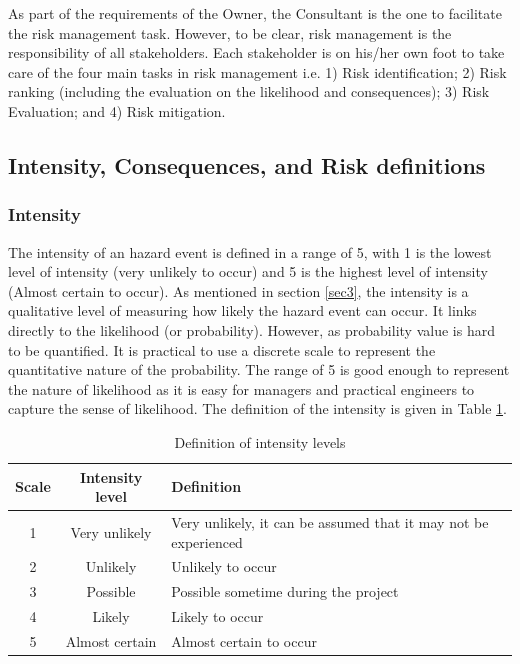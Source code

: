 \documentclass[10pt,halfline,a4paper]{ouparticle}
\begin{document}
As part of the requirements of the Owner, the Consultant is the one to facilitate the risk management task. However, to be clear, risk management is the responsibility of all stakeholders. Each stakeholder is on his/her own foot to take care of the four main tasks in risk management i.e. 1) Risk identification; 2) Risk ranking (including the evaluation on the likelihood and consequences); 3) Risk Evaluation; and 4) Risk mitigation.
\subsection{Intensity, Consequences, and Risk definitions}
\subsubsection{Intensity} \label{lik}
The intensity of an hazard event is defined in a range of 5, with 1 is the lowest level of intensity (very unlikely to occur) and 5 is the highest level of intensity (Almost certain to occur). As mentioned in section \ref{sec3}, the intensity is a qualitative level of measuring how likely the hazard event can occur. It links directly to the likelihood (or probability). However, as probability value is hard to be quantified. It is practical to use a discrete scale to represent the quantitative nature of the probability. The range of 5 is good enough to represent the nature of likelihood as it is easy for managers and practical engineers to capture the sense of likelihood. The definition of the intensity is given in Table \ref{tbl_intensity}.

\begin{table}
\centering
\caption{Definition of intensity levels} 
\begin{tabular}{l|p{2cm}|p{10cm}}
\hline
\multicolumn{1}{c|}{Scale} & \multicolumn{1}{c|}{Intensity level} & Definition \\ 
\hline
\multicolumn{1}{c|}{1} & \multicolumn{1}{c|}{Very unlikely} & Very unlikely, it can be assumed that it may not be experienced \\ 
\multicolumn{1}{c|}{2} & \multicolumn{1}{c|}{Unlikely} & Unlikely to occur \\ 
\multicolumn{1}{c|}{3} & \multicolumn{1}{c|}{Possible} & Possible sometime during the project \\ 
\multicolumn{1}{c|}{4} & \multicolumn{1}{c|}{Likely} & Likely to occur \\ 
\multicolumn{1}{c|}{5} & \multicolumn{1}{c|}{Almost certain} & Almost certain to occur \\ 
\hline
\end{tabular}
\label{tbl_intensity}
\end{table}
\end{document}
